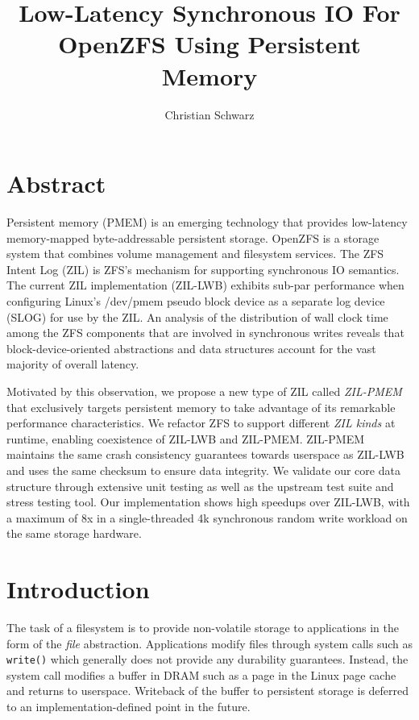 \documentclass[12pt,a4paper,twoside]{book}
\begin{document}
\frontmatter
{}

\title{Low-Latency Synchronous IO For OpenZFS Using Persistent Memory}
\author{Christian Schwarz}
\maketitle



\chapter{Abstract}
Persistent memory (PMEM) is an emerging technology that provides low-latency memory-mapped byte-addressable persistent storage.
OpenZFS is a storage system that combines volume management and filesystem services.
The ZFS Intent Log (ZIL) is ZFS's mechanism for supporting synchronous IO semantics.
The current ZIL implementation (ZIL-LWB) exhibits sub-par performance when configuring Linux's \mbox{/dev/pmem} pseudo block device as a separate log device (SLOG) for use by the ZIL.
An analysis of the distribution of wall clock time among the ZFS components that are involved in synchronous writes reveals that block-device-oriented abstractions and data structures account for the vast majority of overall latency.

Motivated by this observation, we propose a new type of ZIL called \textit{ZIL-PMEM} that exclusively targets persistent memory to take advantage of its remarkable performance characteristics.
We refactor ZFS to support different \textit{ZIL kinds} at runtime, enabling coexistence of ZIL-LWB and ZIL-PMEM.
ZIL-PMEM maintains the same crash consistency guarantees towards userspace as ZIL-LWB and uses the same checksum to ensure data integrity.
We validate our core data structure through extensive unit testing as well as the upstream test suite and stress testing tool.
Our implementation shows high speedups over ZIL-LWB, with a maximum of 8x in a single-threaded 4k synchronous random write workload on the same storage hardware.

\mainmatter
\listoftodos

\cleardoublepage
{}
{}
\tableofcontents


\chapter{Introduction}
The task of a filesystem is to provide non-volatile storage to applications in the form of the \textit{file} abstraction.
Applications modify files through system calls such as \lstinline{write()} which generally does not provide any durability guarantees.
Instead, the system call modifies a buffer in DRAM such as a page in the Linux page cache and returns to userspace.
Writeback of the buffer to persistent storage is deferred to an implementation-defined point in the future.
\end{document}
